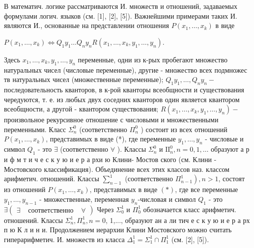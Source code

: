 \documentclass[10pt]{article}
\begin{document}
В математич. логике рассматриваются И. множеств и отношений, задаваемых формулами логич. языков (см. [1], [2], [5]). Важнейшими примерами таких И. являются И., основанные на представлении отношения $P\left(x_{1}, \ldots, x_{k}\right)$ в виде



$P\left(x_{1}, \ldots, x_{k}\right) \Leftrightarrow Q_{1} y_{1} \ldots Q_{n} y_{n} R\left(x_{1}, \ldots, x_{k}, y_{1}, \ldots, y_{n}\right)$.



Здесь $x_{1}, \ldots, x_{k}, y_{1}, \ldots, y_{n}$ переменные, одни из к-рых пробегают множество натуральных чисел (числовые переменные), другие - множество всех подмножес тв натуральных чисел (множественные переменные); $Q_{1} y_{1}, \ldots, Q_{n} y_{n}-$ последовательность кванторов, в к-рой кванторы всеобщности и существования чередуются, т. е. из любых двух соседних кванторов один является квантором всеобщности, а другой - квантором существования; $R\left(x_{1}, \ldots, x_{k}, y_{1}, \ldots, y_{n}\right)-$ произвольное рекурсивное отношение с числовыми и множественными переменными. Класс $\Sigma_{n}^{0}$ (соответственно $\Pi_{n}^{0}$ ) состоит из всех отношений $P\left(x_{1}, \ldots, x_{k}\right)$, представимых в виде (*), где переменные $y_{1}, \ldots, y_{n}$ - числовые и символ $Q_{1}$ - это $\exists$ (соответственно $\forall$ ). Классы $\Sigma_{n}^{0}$ и $\mathrm{II}_{n}^{0}, n=0,1, \ldots$ образуют а р и ф м т и ч е с к у ю и е р а рхи ю Клини- Мостов ского (см. Клини - Мостовского классификация). Объединение всех этих классов наз. классом арифметич. отношений. Классы $\sum_{n-1}^{1}$ (соответственно $\left.\Pi_{n-1}^{1}\right), n>1$, состоят из отношений $P\left(x_{1}, \ldots, x_{k}\right)$, представимых в виде $(*)$, где все переменные $y_{1}, \ldots, y_{n-1}$ - множественные, переменная $y_{n}$-числовая и символ $Q_{1}$ - это $\exists\left(\begin{array}{llll}\exists & \text { соответственно } & \forall\end{array}\right)$ Через $\Sigma_{0}^{1}$ и $\Pi_{0}^{1}$ обозначается класс арифметич. отношений. Классы $\Sigma_{n}^{1}, \Pi_{n}^{1}, n=0$, 1,..., образуют ан а ли тич е с к у ю и е р а рх п ю К л и н и. Продолжением иерархии Клини Мостовского можно считать гиперарифметич. И. множеств из класса $\Delta_{1}^{1}=\Sigma_{1}^{1} \cap \Pi_{1}^{1}$ (см. [2], [5]).
\end{document}
